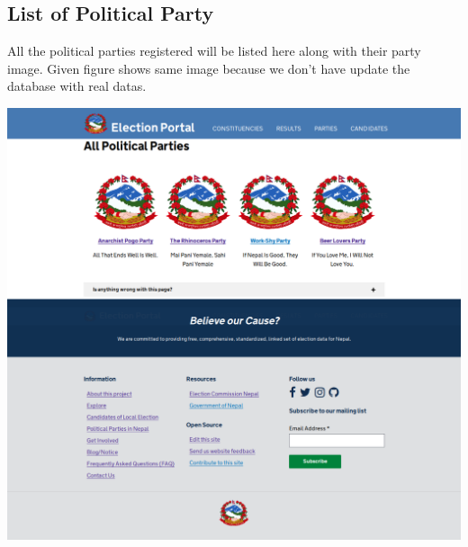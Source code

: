 \documentclass[12pt, a4paper, titlepage]{report}
\begin{document}
\subsection{List of Political Party}
All the political parties registered will be listed here along with their party image. Given figure shows same image because we don't have update the database with real datas.\\
\begin{center}
\includegraphics[scale=0.25]{List_of_Political_Party.png}\\
\end{center}

\newpage
\end{document}
